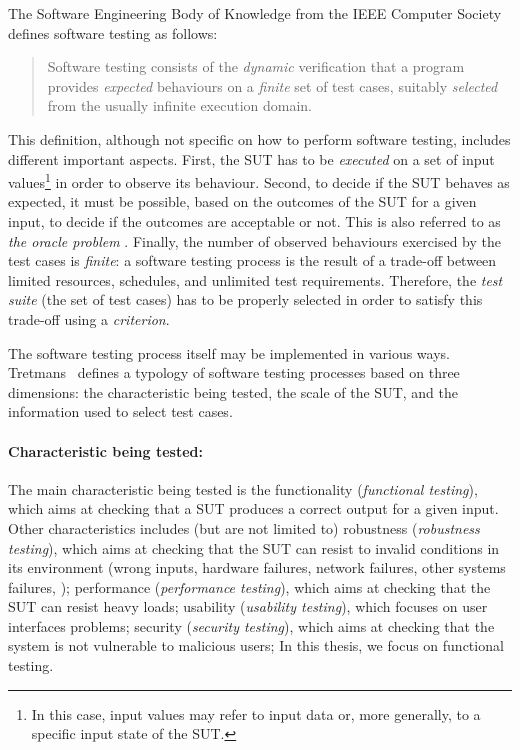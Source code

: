 The Software Engineering Body of Knowledge from the IEEE Computer Society \cite{swebok2014} defines software testing as follows:
%
\begin{quote}
Software testing consists of the \emph{dynamic} verification that a program provides \emph{expected} behaviours on a \emph{finite} set of test cases, suitably \emph{selected} from the usually infinite execution domain.
\end{quote}
%
This definition, although not specific on how to perform software testing, includes different important aspects. First, the SUT has to be \emph{executed} on a set of input values\footnote{In this case, input values may refer to input data or, more generally, to a specific input state of the SUT.} in order to observe its behaviour. Second, to decide if the SUT behaves as expected, it must be possible, based on the outcomes of the SUT for a given input, to decide if the outcomes are acceptable or not. This is also referred to as \emph{the oracle problem} \cite{swebok2014}. 
Finally, the number of observed behaviours exercised by the test cases is \emph{finite}: a software testing process is the result of a trade-off between limited resources, schedules, and unlimited test requirements. Therefore, the \emph{\gls{test suite}} (\ie the set of test cases) has to be properly selected in order to satisfy this trade-off using a \emph{criterion}.

The software testing process itself may be implemented in various ways. Tretmans~\cite{Tretmans2004,Utting2007} defines a typology of software testing processes based on three dimensions: the characteristic being tested, the scale of the SUT, and the information used to select test cases.

\paragraph{Characteristic being tested:} 
%
The main characteristic being tested is the functionality (\emph{functional testing}), which aims at checking that a SUT produces a correct output for a given input. Other characteristics includes (but are not limited to) robustness (\emph{robustness testing}), which aims at checking that the SUT can resist to invalid conditions in its environment (\eg wrong inputs, hardware failures, network failures, other systems failures, \etc); performance (\emph{performance testing}), which aims at checking that the SUT can resist heavy loads; usability (\emph{usability testing}), which focuses on user interfaces problems; security (\emph{security testing}), which aims at checking that the system is not vulnerable to malicious users; \etc In this thesis, we focus on functional testing.
 
